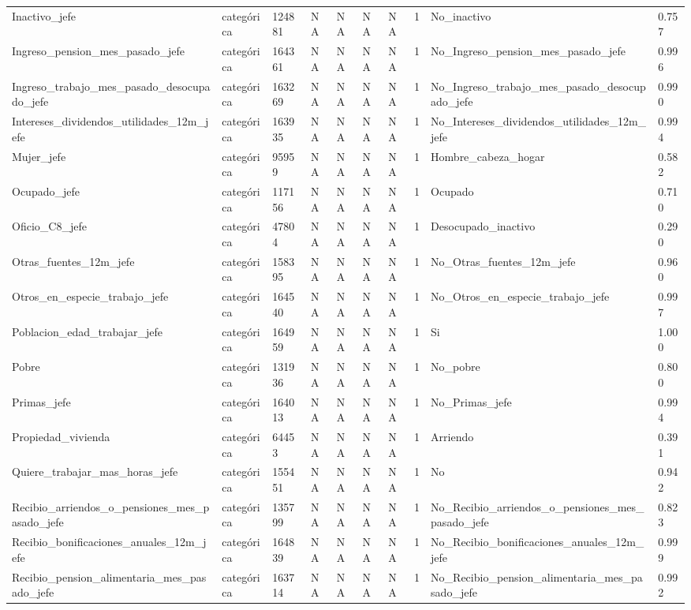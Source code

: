 \begin{longtable}[t]{llllllllll}
Inactivo\_jefe & categórica & 124881 & NA & NA & NA & NA & 1 & No\_inactivo & 0.757\\
Ingreso\_pension\_mes\_pasado\_jefe & categórica & 164361 & NA & NA & NA & NA & 1 & No\_Ingreso\_pension\_mes\_pasado\_jefe & 0.996\\
Ingreso\_trabajo\_mes\_pasado\_desocupado\_jefe & categórica & 163269 & NA & NA & NA & NA & 1 & No\_Ingreso\_trabajo\_mes\_pasado\_desocupado\_jefe & 0.990\\
Intereses\_dividendos\_utilidades\_12m\_jefe & categórica & 163935 & NA & NA & NA & NA & 1 & No\_Intereses\_dividendos\_utilidades\_12m\_jefe & 0.994\\
Mujer\_jefe & categórica & 95959 & NA & NA & NA & NA & 1 & Hombre\_cabeza\_hogar & 0.582\\
Ocupado\_jefe & categórica & 117156 & NA & NA & NA & NA & 1 & Ocupado & 0.710\\
Oficio\_C8\_jefe & categórica & 47804 & NA & NA & NA & NA & 1 & Desocupado\_inactivo & 0.290\\
Otras\_fuentes\_12m\_jefe & categórica & 158395 & NA & NA & NA & NA & 1 & No\_Otras\_fuentes\_12m\_jefe & 0.960\\
Otros\_en\_especie\_trabajo\_jefe & categórica & 164540 & NA & NA & NA & NA & 1 & No\_Otros\_en\_especie\_trabajo\_jefe & 0.997\\
Poblacion\_edad\_trabajar\_jefe & categórica & 164959 & NA & NA & NA & NA & 1 & Si & 1.000\\
Pobre & categórica & 131936 & NA & NA & NA & NA & 1 & No\_pobre & 0.800\\
Primas\_jefe & categórica & 164013 & NA & NA & NA & NA & 1 & No\_Primas\_jefe & 0.994\\
Propiedad\_vivienda & categórica & 64453 & NA & NA & NA & NA & 1 & Arriendo & 0.391\\
Quiere\_trabajar\_mas\_horas\_jefe & categórica & 155451 & NA & NA & NA & NA & 1 & No & 0.942\\
Recibio\_arriendos\_o\_pensiones\_mes\_pasado\_jefe & categórica & 135799 & NA & NA & NA & NA & 1 & No\_Recibio\_arriendos\_o\_pensiones\_mes\_pasado\_jefe & 0.823\\
Recibio\_bonificaciones\_anuales\_12m\_jefe & categórica & 164839 & NA & NA & NA & NA & 1 & No\_Recibio\_bonificaciones\_anuales\_12m\_jefe & 0.999\\
Recibio\_pension\_alimentaria\_mes\_pasado\_jefe & categórica & 163714 & NA & NA & NA & NA & 1 & No\_Recibio\_pension\_alimentaria\_mes\_pasado\_jefe & 0.992\\

\end{longtable}
